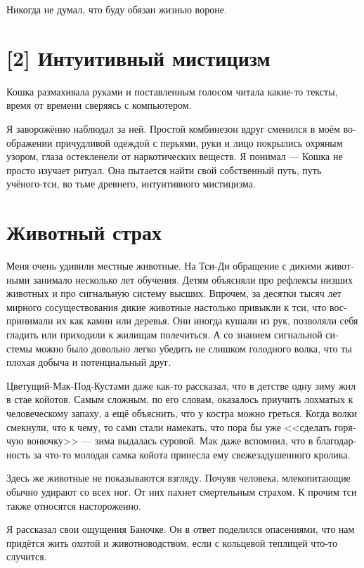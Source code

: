 \documentclass[a4paper,12pt,fleqn]{book}\usepackage{cooltooltips}\usepackage{polyglossia}\setdefaultlanguage[babelshorthands=true]{russian}\setotherlanguage{english}\defaultfontfeatures{Ligatures=TeX,Mapping=tex-text} \usepackage{xcolor}\definecolor{lightgray}{HTML}{bbbbbb}\color{lightgray}\newcommand{\ml}[3]{\textenglish{\textcolor{black}{#3}}}
\begin{document}
{Никогда не думал, что буду обязан жизнью вороне.

\section{[2] Интуитивный мистицизм}

Кошка размахивала руками и поставленным голосом читала какие-то тексты, время от времени сверяясь с компьютером.

Я заворожённо наблюдал за ней.
Простой комбинезон вдруг сменился в моём воображении причудливой одеждой с перьями, руки и лицо покрылись охряным узором, глаза остекленели от наркотических веществ.
Я понимал --- Кошка не просто изучает ритуал.
Она пытается найти свой собственный путь, путь учёного-тси, во тьме древнего, интуитивного мистицизма.

\section{Животный страх}

Меня очень удивили местные животные.
На Тси-Ди обращение с дикими животными занимало несколько лет обучения.
Детям объясняли про рефлексы низших животных и про сигнальную систему высших.
Впрочем, за десятки тысяч лет мирного сосуществования дикие животные настолько привыкли к тси, что воспринимали их как камни или деревья.
Они иногда кушали из рук, позволяли себя гладить или приходили к жилищам полечиться.
А со знанием сигнальной системы можно было довольно легко убедить не слишком голодного волка, что ты плохая добыча и потенциальный друг.

Цветущий-Мак-Под-Кустами даже как-то рассказал, что в детстве одну зиму жил в стае койотов.
Самым сложным, по его словам, оказалось приучить лохматых к человеческому запаху, а ещё объяснить, что у костра можно греться.
Когда волки смекнули, что к чему, то сами стали намекать, что пора бы уже <<сделать горячую вонючку>> --- зима выдалась суровой.
Мак даже вспомнил, что в благодарность за что-то молодая самка койота принесла ему свежезадушенного кролика.

Здесь же животные не показываются взгляду.
Почуяв человека, млекопитающие обычно удирают со всех ног.
От них пахнет смертельным страхом.
К прочим тси также относятся настороженно.

Я рассказал свои ощущения Баночке.
Он в ответ поделился опасениями, что нам придётся жить охотой и животноводством, если с кольцевой теплицей что-то случится.

}
\end{document}
